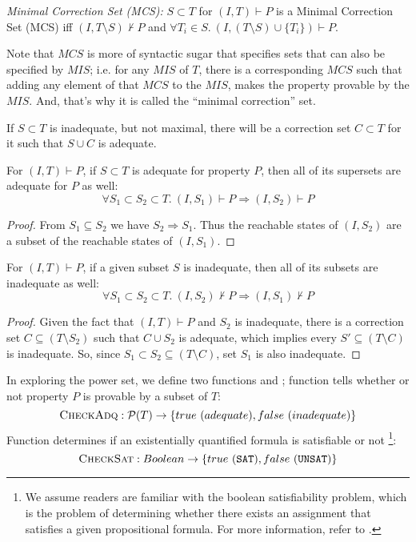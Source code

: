 \begin{definition}{\emph{Minimal Correction Set (MCS):}}
  \label{def:mcs}
  $S \subset T$ for $(I, T) \vdash P$ is a Minimal Correction Set (MCS) iff
  $(I, T \setminus S) \nvdash P$ and $\forall T_i \in S.~ (I, (T \setminus S)\cup \{T_i\}) \vdash P$.
\end{definition}

Note that $MCS$ is more of syntactic sugar that specifies sets that can also be specified by $MIS$; i.e. for any $MIS$ of $T$, there is a corresponding $MCS$ such that adding any element of that $MCS$ to the $MIS$, makes the property provable by the $MIS$.
And, that's why it is called the ``minimal correction'' set. 
\begin{note}
If $S \subset T$ is inadequate, but not maximal, there will be a correction set $C \subset T$ for it such that $S \cup C$ is adequate.
\end{note}

\begin{lemma}
\label{lem:adeq}
For $(I, T) \vdash P$, if $S \subset T$ is adequate for property $P$, then all of its supersets are adequate for $P$ as well:
\allowbreak $$\forall S_1 \subset S_2 \subset T.~ (I, S_1) \vdash P \Rightarrow (I, S_2) \vdash P$$
\end{lemma}
\begin{proof}
From $S_1 \subseteq S_2$ we have $S_2 \Rightarrow S_1$. Thus the
  reachable states of $(I, S_2)$ are a subset of the reachable states
  of $(I, S_1)$.
\end{proof}

\begin{lemma}
\label{lem:inadeq}
For $(I, T) \vdash P$, if a given subset $S$ is inadequate, then all of its subsets are inadequate as well:
\allowbreak $$\forall S_1 \subset S_2 \subset T.~ (I, S_2) \nvdash P \Rightarrow (I, S_1) \nvdash P$$
\end{lemma}
\begin{proof}
Given the fact that $(I, T) \vdash P$ and $S_2$ is inadequate,
there is a correction set $C \subseteq (T\setminus S_2)$ such that
$C \cup S_2$ is adequate, which implies every $S' \subseteq (T \setminus C)$ is inadequate.
So, since $S_1 \subset S_2 \subseteq (T \setminus C)$, set $S_1$ is also inadequate.
\end{proof}

In exploring the power set,
we define two functions \checksat and \isadeq; function \isadeq tells whether or not property $P$ is provable by a subset of $T$:
$$\textsc{CheckAdq} : \mathcal{P}(T) \rightarrow \{true~(adequate), false~(inadequate)\}$$
\noindent Function \checksat determines if an
existentially quantified formula is satisfiable or not
\footnote{We assume readers are familiar with the boolean satisfiability problem, which is the problem of determining whether there exists an assignment that satisfies a given propositional formula. For more information, refer to \cite{cook1971complexity}.}:
$$\textsc{CheckSat}: Boolean \rightarrow \{ true~(\texttt{SAT}), false~(\texttt{UNSAT}) \}$$


